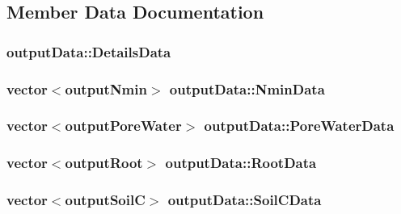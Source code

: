 \subsection{Member Data Documentation}
\hypertarget{classoutput_data_ae50b979972f6c57c3881edd6a7dd96b4}{
\subsubsection[{DetailsData}]{ {\bf outputData::DetailsData}}}
\label{classoutput_data_ae50b979972f6c57c3881edd6a7dd96b4}
\hypertarget{classoutput_data_a213ddbf3e83fe1f17f12994794ae649d}{
\subsubsection[{NminData}]{\setlength{\rightskip}{0pt plus 5cm}vector$<${\bf outputNmin}$>$ {\bf outputData::NminData}}}
\label{classoutput_data_a213ddbf3e83fe1f17f12994794ae649d}
\hypertarget{classoutput_data_a9049c356d01885832d2118f58ed94bba}{
\subsubsection[{PoreWaterData}]{\setlength{\rightskip}{0pt plus 5cm}vector$<${\bf outputPoreWater}$>$ {\bf outputData::PoreWaterData}}}
\label{classoutput_data_a9049c356d01885832d2118f58ed94bba}
\hypertarget{classoutput_data_a52a733aa57217c278df4d06e50c48ad8}{
\subsubsection[{RootData}]{\setlength{\rightskip}{0pt plus 5cm}vector$<${\bf outputRoot}$>$ {\bf outputData::RootData}}}
\label{classoutput_data_a52a733aa57217c278df4d06e50c48ad8}
\hypertarget{classoutput_data_aa4e17ffda4c4dde9a0796d35707f6067}{
\subsubsection[{SoilCData}]{\setlength{\rightskip}{0pt plus 5cm}vector$<${\bf outputSoilC}$>$ {\bf outputData::SoilCData}}}
